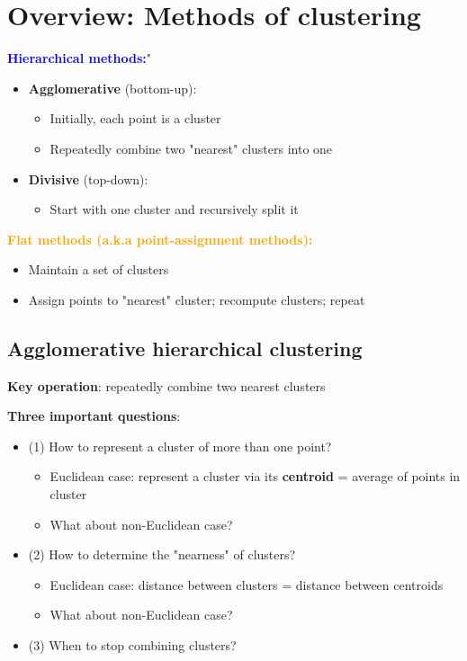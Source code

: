 \documentclass[11pt]{article}
\begin{document}
\section*{Overview: Methods of clustering}

\textbf{\textcolor{blue}{Hierarchical methods:}}"
\begin{itemize}
	\item \textbf{Agglomerative} (bottom-up):
		\begin{itemize}
			\item Initially, each point is a cluster
	\item Repeatedly combine two "nearest" clusters into one
	\end{itemize}
		
	\item \textbf{Divisive} (top-down):
		\begin{itemize}
			\item Start with one cluster and recursively split it
		\end{itemize}
\end{itemize}

\textbf{\textcolor{orange}{Flat methods (a.k.a point-assignment methods):}}
\begin{itemize}
	\item Maintain a set of clusters
	\item Assign points to "nearest" cluster; recompute clusters; repeat
\end{itemize}

\subsection*{Agglomerative hierarchical clustering}

\vspace{0.25cm}
\textbf{Key operation}: repeatedly combine two nearest clusters

\textbf{Three important questions}:
\begin{itemize}
	\item (1) How to represent a cluster of more than one point?
		\begin{itemize}
			\item Euclidean case: represent a cluster via its \textbf{centroid} = average of points in cluster
			\item What about non-Euclidean case? 
		\end{itemize}
	\item (2) How to determine the "nearness" of clusters?
		\begin{itemize}
			\item Euclidean case: distance between clusters = distance between centroids
			\item What about non-Euclidean case?
		\end{itemize}
	\item (3) When to stop combining clusters?
\end{itemize}
\end{document}
